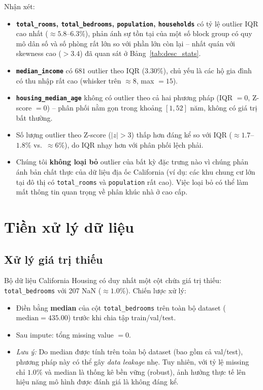 \documentclass[12pt,a4paper]{article}
\begin{document}
Nhận xét:
\begin{itemize}
  \item \textbf{\texttt{total\_rooms}, \texttt{total\_bedrooms},
        \texttt{population}, \texttt{households}} có tỷ lệ outlier IQR
        cao nhất ($\approx 5.8$--$6.3\%$), phản ánh sự tồn tại của một số
        block group có quy mô dân số và số phòng rất lớn so với phần lớn
        còn lại -- nhất quán với skewness cao ($> 3.4$) đã quan sát ở
        Bảng~\ref{tab:desc_stats}.
  \item \textbf{\texttt{median\_income}} có $681$ outlier theo IQR
        ($3.30\%$), chủ yếu là các hộ gia đình có thu nhập rất cao
        (whisker trên $\approx 8$, max $= 15$).
  \item \textbf{\texttt{housing\_median\_age}} không có outlier theo cả
        hai phương pháp (IQR $= 0$, Z-score $= 0$) -- phân phối nằm gọn
        trong khoảng $[1, 52]$ năm, không có giá trị bất thường.
  \item Số lượng outlier theo Z-score ($|z| > 3$) thấp hơn đáng kể so
        với IQR ($\approx 1.7$--$1.8\%$ vs.\ $\approx 6\%$), do IQR nhạy
        hơn với phân phối lệch phải.
  \item Chúng tôi \textbf{không loại bỏ} outlier của bất kỳ đặc trưng
        nào vì chúng phản ánh bản chất thực của dữ liệu địa ốc California
        (ví dụ: các khu chung cư lớn tại đô thị có \texttt{total\_rooms}
        và \texttt{population} rất cao). Việc loại bỏ có thể làm mất thông
        tin quan trọng về phân khúc nhà ở cao cấp.
\end{itemize}

\section{Tiền xử lý dữ liệu}
\label{sec:preprocessing}

\subsection{Xử lý giá trị thiếu}

Bộ dữ liệu California Housing có duy nhất một cột chứa giá trị thiếu:
\texttt{total\_bedrooms} với 207 NaN ($\approx 1.0\%$). Chiến lược xử lý:

\begin{itemize}
  \item Điền bằng \textbf{median} của cột \texttt{total\_bedrooms}
        trên toàn bộ dataset ($\text{median} = 435.00$) trước khi chia
        tập train/val/test.
  \item Sau impute: tổng missing value $= 0$.
  \item \textit{Lưu ý:} Do median được tính trên toàn bộ dataset (bao gồm
        cả val/test), phương pháp này có thể gây \emph{data leakage} nhẹ.
        Tuy nhiên, với tỷ lệ missing chỉ $1.0\%$ và median là thống kê
        bền vững (robust), ảnh hưởng thực tế lên hiệu năng mô hình
        được đánh giá là không đáng kể.
\end{itemize}
\end{document}
